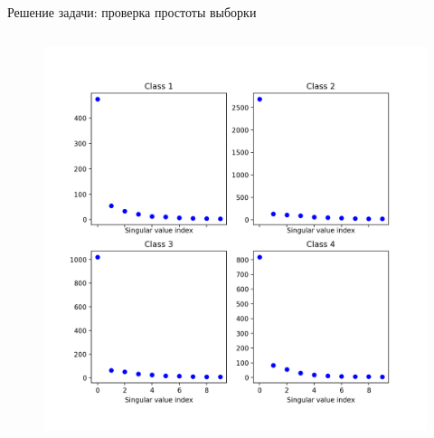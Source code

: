 \documentclass{beamer}
\begin{document}
\begin{frame}{Решение задачи: проверка простоты выборки}
\begin{columns}[T]
\begin{column}{.48\textwidth}
    \begin{figure}[ht]
        \centering
          \includegraphics[width=\textwidth]{../pics/sv_analysis.png}
    \end{figure}

        \end{column}%
    \end{columns}
\end{frame}

\end{document}
